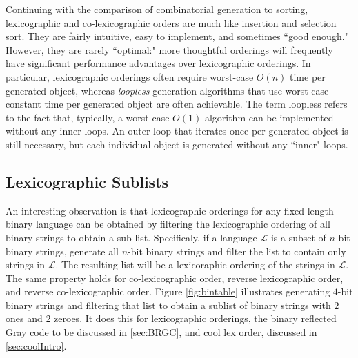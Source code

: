 Continuing with the comparison of combinatorial generation to sorting, lexicographic and co-lexicographic orders are much like insertion and selection sort.  They are fairly intuitive, easy to implement, and sometimes ``good enough."  However, they are rarely ``optimal:" more thoughtful orderings will frequently have significant performance advantages over lexicographic orderings. In particular, lexicographic orderings often require worst-case $O(n)$ time per generated object, whereas \emph{loopless} generation algorithms that use worst-case constant time per generated object are often achievable. The term loopless refers to the fact that, typically, a worst-case $O(1)$ algorithm can be implemented without any inner loops.  An outer loop that iterates once per generated object is still necessary, but each individual object is generated without any ``inner" loops.

 \subsection{Lexicographic Sublists}
 An interesting observation is that lexicographic orderings for any fixed length binary language can be obtained by filtering the lexicographic ordering of all binary strings to obtain a sub-list. Specificaly, if a language $\mathcal{L}$ is a subset of $n$-bit binary strings, generate all $n$-bit binary strings and filter the list to contain only strings in $\mathcal{L}$.  The resulting list will be a lexicoraphic ordering of the strings in $\mathcal{L}$.  The same property holds for co-lexicographic order, reverse lexicographic order, and reverse co-lexicographic order.  Figure \ref{fig:bintable} illustrates generating $4$-bit binary strings and filtering that list to obtain a sublist of binary strings with $2$ ones and $2$ zeroes.  It does this for lexicographic orderings, the binary reflected Gray code to be discussed in \ref{sec:BRGC}, and cool lex order, discussed in \ref{sec:coolIntro}.


